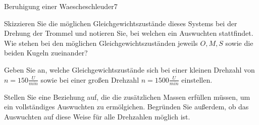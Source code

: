 \begin{problem}{Beruhigung einer Waescheschleuder}{7}
\begin{abcenum}
  \item Skizzieren Sie die möglichen Gleichgewichtszustände dieses Systems bei der Drehung der Trommel und notieren Sie, bei welchen ein Auswuchten stattfindet.  Wie stehen bei den möglichen Gleichgewichtszuständen jeweils $O, M, S$ sowie die beiden Kugeln zueinander?
  \item Geben Sie an, welche Gleichgewichtszustände sich bei einer kleinen Drehzahl von $n=150\unit{\frac{U}{min}}$ sowie bei einer großen Drehzahl $n=1500\unit{\frac{U}{min}}$ einstellen.
  \item Stellen Sie eine Beziehung auf, die die zusätzlichen Massen erfüllen müssen, um ein vollständiges Auswuchten zu ermölgichen.  Begründen Sie außerdem, ob das Auswuchten auf diese Weise für alle Drehzahlen möglich ist.
\end{abcenum}

\end{problem}



